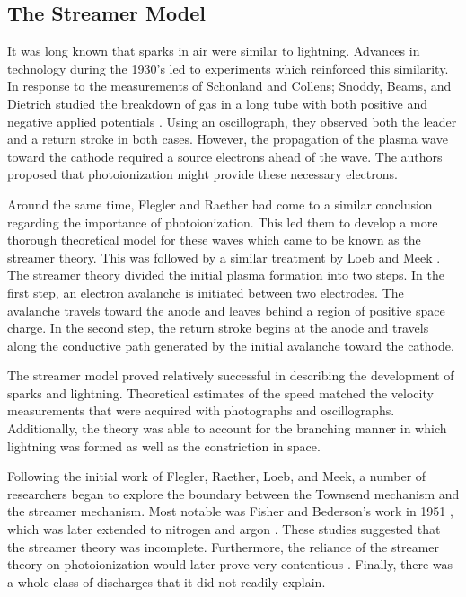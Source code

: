 \subsection{The Streamer Model}

It was long known that sparks in air were similar to lightning. Advances in
technology during the 1930's led to experiments which reinforced this
similarity. In response to the measurements of Schonland and Collens; Snoddy,
Beams, and Dietrich studied the breakdown of gas in a long tube with both
positive and negative applied potentials \cite{Snoddy1936}. Using an
oscillograph, they observed both the leader and a return stroke in both cases.
However, the propagation of the plasma wave toward the cathode required a source
electrons ahead of the wave. The authors proposed that photoionization might
provide these necessary electrons.

Around the same time, Flegler and Raether had come to a similar conclusion
regarding the importance of photoionization. This led them to develop a more
thorough theoretical model for these waves \cite{Flegler1936} which came to be
known as the streamer theory. This was followed by a similar treatment by Loeb
and Meek \cite{Loeb1940, Loeb1940a, Meek1940}. The streamer theory divided the
initial plasma formation into two steps. In the first step, an electron
avalanche is initiated between two electrodes. The avalanche travels toward the
anode and leaves behind a region of positive space charge. In the second step,
the return stroke begins at the anode and travels along the conductive path
generated by the initial avalanche toward the cathode.

The streamer model proved relatively successful in describing the development of
sparks and lightning. Theoretical estimates of the speed matched the velocity
measurements that were acquired with photographs and oscillographs.
Additionally, the theory was able to account for the branching manner in which
lightning was formed as well as the constriction in space.

Following the initial work of Flegler, Raether, Loeb, and Meek, a number of
researchers began to explore the boundary between the Townsend mechanism and the
streamer mechanism. Most notable was Fisher and Bederson's work in 1951
\cite{Fisher1951}, which was later extended to nitrogen \cite{Kachickas1952} and
argon \cite{Kachickas1953}. These studies suggested that the streamer theory was
incomplete. Furthermore, the reliance of the streamer theory on photoionization
would later prove very contentious \cite{Kunhardt1988}. Finally, there was a
whole class of discharges that it did not readily explain.

